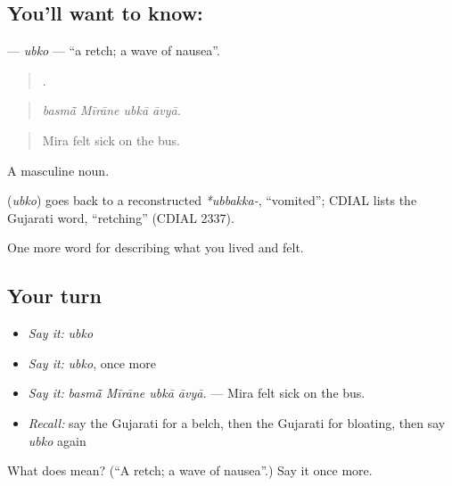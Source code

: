\subsection*{You'll want to know: }
\textbf{} — \emph{ubko} — \textquotedblleft{}a retch; a wave of nausea\textquotedblright{}.

\begin{quote}
   .
\end{quote}

\begin{quote}
\emph{basmā̃ Mīrāne ubkā āvyā.}
\end{quote}

\begin{quote}
Mira felt sick on the bus.
\end{quote}

A masculine noun.

\begin{cousinweb}
\textbf{} (\emph{ubko}) goes back to a reconstructed \emph{*ubbakka-}, \textquotedblleft{}vomited\textquotedblright{}; CDIAL lists the Gujarati word, \textquotedblleft{}retching\textquotedblright{} (CDIAL 2337).
\end{cousinweb}

\begin{grammarlens}[title={What you've built}]
One more word for describing what you lived and felt.
\end{grammarlens}

\subsection*{Your turn}
\begin{itemize}
\raggedright
  \item \emph{Say it:} \emph{ubko}
  \item \emph{Say it:} \emph{ubko}, once more
  \item \emph{Say it:} \emph{basmā̃ Mīrāne ubkā āvyā.} — Mira felt sick on the bus.
  \item \emph{Recall:} say the Gujarati for a belch, then the Gujarati for bloating, then say \emph{ubko} again
\end{itemize}

\begin{tcolorbox}[breakable,colback=teal!4,colframe=teal!35!black,title={Before you move on}]
What does  mean? (\textquotedblleft{}A retch; a wave of nausea\textquotedblright{}.) Say it once more.
\end{tcolorbox}
